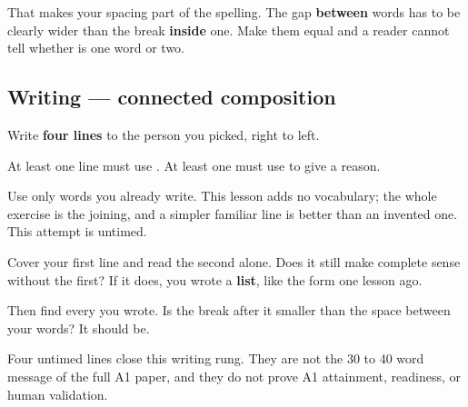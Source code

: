 That makes your spacing part of the spelling. The gap \textbf{between} words has to be clearly wider than the break \textbf{inside} one. Make them equal and a reader cannot tell whether \textbf{} is one word or two.

\subsection*{Writing — connected composition}
Write \textbf{four lines} to the person you picked, right to left.

At least one line must use \textbf{}. At least one must use \textbf{} to give a reason.

Use only words you already write. This lesson adds no vocabulary; the whole exercise is the joining, and a simpler familiar line is better than an invented one. This attempt is untimed.

\begin{tcolorbox}[breakable,colback=teal!4,colframe=teal!35!black,title={Before you move on}]
Cover your first line and read the second alone. Does it still make complete sense without the first? If it does, you wrote a \textbf{list}, like the form one lesson ago.

Then find every \textbf{} you wrote. Is the break after it smaller than the space between your words? It should be.

Four untimed lines close this writing rung. They are not the 30 to 40 word message of the full A1 paper, and they do not prove A1 attainment, readiness, or human validation.
\end{tcolorbox}
